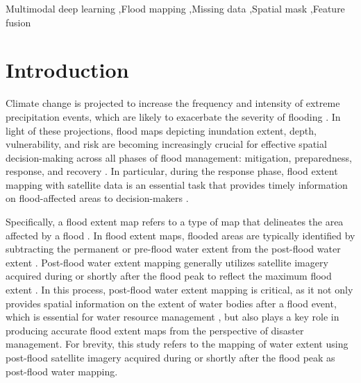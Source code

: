 \documentclass[preprint,12pt,authoryear]{elsarticle}
\begin{document}
\begin{frontmatter}

\begin{keyword}
Multimodal deep learning \sep Flood mapping \sep Missing data \sep Spatial mask \sep Feature fusion 



\end{keyword}

\end{frontmatter}


\section{Introduction}
\label{Section1}

Climate change is projected to increase the frequency and intensity of extreme precipitation events, which are likely to exacerbate the severity of flooding \citep{najibi2018recent, shu2023integrating, tabari2020climate}. In light of these projections, flood maps depicting inundation extent, depth, vulnerability, and risk \citep{bentivoglio2022deep, cova1999gis} are becoming increasingly crucial for effective spatial decision-making across all phases of flood management: mitigation, preparedness, response, and recovery \citep{ajmar2017response}. In particular, during the response phase, flood extent mapping with satellite data is an essential task that provides timely information on flood-affected areas to decision-makers \citep{wania2021increasing}.

Specifically, a flood extent map refers to a type of map that delineates the area affected by a flood \citep{hashemi2021flood, wang2002mapping}. In flood extent maps, flooded areas are typically identified  by subtracting the permanent or pre-flood water extent from the post-flood water extent \citep{ajmar2017response, he2023cross, saleh2024dam}. Post-flood water extent mapping generally utilizes satellite imagery acquired during or shortly after the flood peak to reflect the maximum flood extent \citep{huang2018near, misra2025mapping, samela2022satellite, vanama2021change}. In this process, post-flood water extent mapping is critical, as it not only provides spatial information on the extent of water bodies after a flood event, which is essential for water resource management \citep{risling2024comparison}, but also plays a key role in producing accurate flood extent maps from the perspective of disaster management. For brevity, this study refers to the mapping of water extent using post-flood satellite imagery acquired during or shortly after the flood peak as post-flood water mapping.
\end{document}
